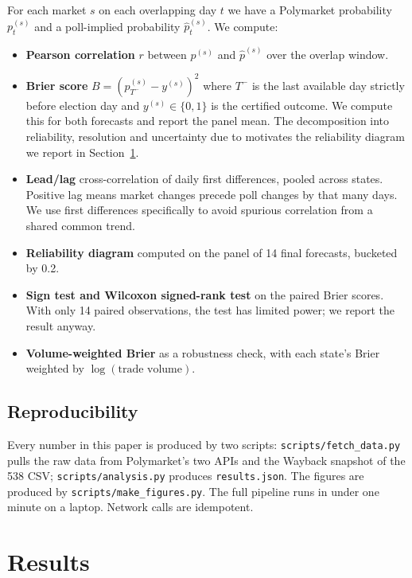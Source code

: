 \documentclass{article}
\begin{document}
For each market $s$ on each overlapping day $t$ we have a Polymarket
probability $p_t^{(s)}$ and a poll-implied probability $\hat p_t^{(s)}$.
We compute:

\begin{itemize}
\item \textbf{Pearson correlation} $r$ between $p^{(s)}$ and $\hat p^{(s)}$
  over the overlap window.
\item \textbf{Brier score} \citep{brier1950verification}
  $B = (p^{(s)}_{T^-} - y^{(s)})^2$ where $T^-$ is the last available
  day strictly before election day and $y^{(s)} \in \{0,1\}$ is the
  certified outcome. We compute this for both forecasts and report the
  panel mean. The decomposition into reliability, resolution and
  uncertainty due to \citet{murphy1973new} motivates the reliability
  diagram we report in Section~\ref{sec:results}.
\item \textbf{Lead/lag} cross-correlation of daily first differences,
  pooled across states. Positive lag means market changes precede poll
  changes by that many days. We use first differences specifically to
  avoid spurious correlation from a shared common trend.
\item \textbf{Reliability diagram} computed on the panel of 14 final
  forecasts, bucketed by 0.2.
\item \textbf{Sign test and Wilcoxon signed-rank test} on the paired
  Brier scores. With only 14 paired observations, the test has limited
  power; we report the result anyway.
\item \textbf{Volume-weighted Brier} as a robustness check, with each
  state's Brier weighted by $\log(\text{trade volume})$.
\end{itemize}

\subsection{Reproducibility}
\label{sec:reproducibility}

Every number in this paper is produced by two scripts:
\texttt{scripts/fetch\_data.py} pulls the raw data from Polymarket's two
APIs and the Wayback snapshot of the 538 CSV;
\texttt{scripts/analysis.py} produces \texttt{results.json}. The figures
are produced by \texttt{scripts/make\_figures.py}. The full pipeline
runs in under one minute on a laptop. Network calls are idempotent.

\section{Results}
\label{sec:results}
\end{document}
